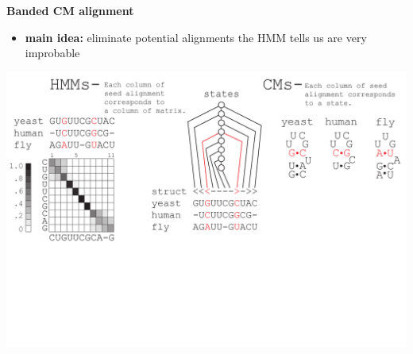 \documentclass[landscape]{slides}
\begin{document}
\begin{slide}
\begin{center}
\large
\textbf{Banded CM alignment}
\end{center}
\medskip
\small
\begin{itemize}
\item
\textbf{main idea:} eliminate potential alignments the HMM tells us are very improbable
\end{itemize}
\begin{center}
\includegraphics[width=8in]{figs/post_hmm_to_cm_map2_layer10}
\end{center}
\vfill
\end{slide}
\end{document}
